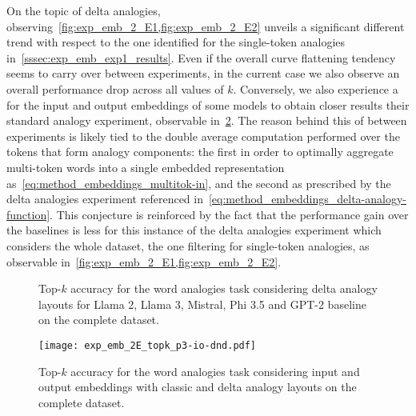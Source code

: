 On the topic of delta analogies, observing~\cref{fig:exp_emb_2_E1,fig:exp_emb_2_E2} unveils a significant different trend with respect to the one identified for the single-token analogies in~\cref{sssec:exp_emb_exp1_results}.
Even if the overall curve flattening tendency seems to carry over between experiments, in the current case we also observe an overall performance drop across all values of $k$.
Conversely, we also experience a  for the input and output embeddings of some models to obtain closer results  their standard analogy experiment, observable in~\cref{fig:exp_emb_2_E3}.
The reason behind this  of  between experiments is likely tied to the double average computation performed over the tokens that form analogy components: the first in order to optimally aggregate multi-token words into a single embedded representation as~\cref{eq:method_embeddings_multitok-in}, and the second as prescribed by the delta analogies experiment referenced in~\cref{eq:method_embeddings_delta-analogy-function}.
This conjecture is  reinforced by the fact that the performance gain over the baselines is less  for this instance of the delta analogies experiment which considers the whole dataset,  the one filtering for single-token analogies, as observable in~\cref{fig:exp_emb_2_E1,fig:exp_emb_2_E2}.

\begin{figure}[t!]
    \centering
    \caption[Top-$k$ accuracy for the word analogies task considering delta analogy layouts for various models on the complete dataset.]{Top-$k$ accuracy for the word analogies task considering delta analogy layouts for Llama 2, Llama 3, Mistral, Phi 3.5 and GPT-2 baseline on the complete dataset.}
    \label{fig:exp_emb_2_E}
\end{figure}
\begin{figure}[t!]
    \centering
    \texttt{[image: exp\_emb\_2E\_topk\_p3-io-dnd.pdf]}
    \caption{Top-$k$ accuracy for the word analogies task considering input and output embeddings with classic and delta analogy layouts on the complete dataset.}
    \label{fig:exp_emb_2_E3}
\end{figure}

